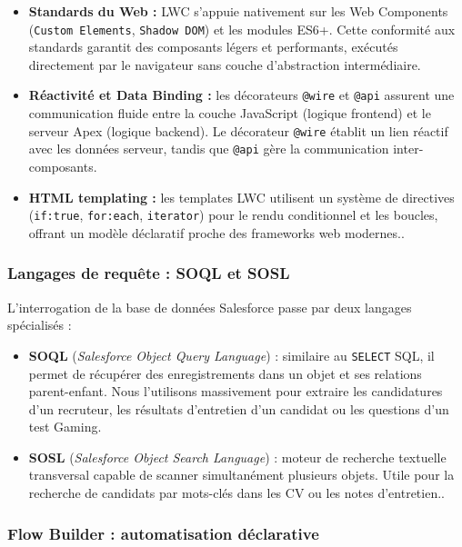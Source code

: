 \begin{itemize}
    \item \textbf{Standards du Web :} LWC s'appuie nativement sur les Web Components (\texttt{Custom Elements}, \texttt{Shadow DOM}) et les modules ES6+. Cette conformité aux standards garantit des composants légers et performants, exécutés directement par le navigateur sans couche d'abstraction intermédiaire.
    \item \textbf{Réactivité et Data Binding :} les décorateurs \texttt{@wire} et \texttt{@api} assurent une communication fluide entre la couche JavaScript (logique frontend) et le serveur Apex (logique backend). Le décorateur \texttt{@wire} établit un lien réactif avec les données serveur, tandis que \texttt{@api} gère la communication inter-composants.
    \item \textbf{HTML templating :} les templates LWC utilisent un système de directives (\texttt{if:true}, \texttt{for:each}, \texttt{iterator}) pour le rendu conditionnel et les boucles, offrant un modèle déclaratif proche des frameworks web modernes.\parencite{URL20}.
\end{itemize}

\subsubsection{Langages de requête : SOQL et SOSL}

L'interrogation de la base de données Salesforce passe par deux langages spécialisés :

\begin{itemize}
    \item \textbf{SOQL} (\textit{Salesforce Object Query Language}) : similaire au \texttt{SELECT} SQL, il permet de récupérer des enregistrements dans un objet et ses relations parent-enfant. Nous l'utilisons massivement pour extraire les candidatures d'un recruteur, les résultats d'entretien d'un candidat ou les questions d'un test Gaming.
    \item \textbf{SOSL} (\textit{Salesforce Object Search Language}) : moteur de recherche textuelle transversal capable de scanner simultanément plusieurs objets. Utile pour la recherche de candidats par mots-clés dans les CV ou les notes d'entretien.\parencite{URL21}.
\end{itemize}

\subsubsection{Flow Builder : automatisation déclarative}

